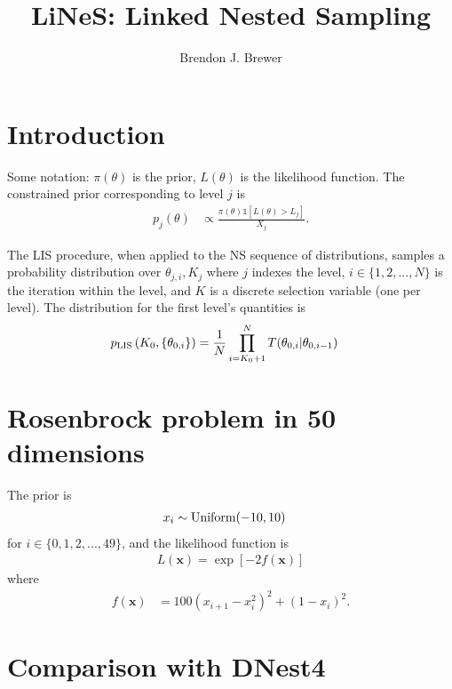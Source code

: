 \documentclass[a4paper, 12pt]{article}
\title{LiNeS: Linked Nested Sampling}
\author{Brendon J. Brewer}
\date{}
\begin{document}
\maketitle


\setlength{\parindent}{0pt}
\setlength{\parskip}{8pt}

\section{Introduction}
Some notation: $\pi(\theta)$ is the prior, $L(\theta)$ is the
likelihood function. The constrained prior corresponding
to level $j$ is
\begin{align}
p_j(\theta) &\propto
\frac{\pi(\theta)\mathds{1}\left[L(\theta) > L_j\right]}
{X_j}.
\end{align}

The LIS procedure, when applied to the NS sequence of
distributions, samples a probability distribution over
$\theta_{j,i}, K_j$ where $j$ indexes the level,
$i \in \{1, 2, ..., N\}$ is the
iteration within the level, and $K$ is a discrete
selection variable (one per level). The distribution for the
first level's quantities is
\begin{align}
p_{\rm LIS}\left(K_0, \left\{\theta_{0,i}\right\}\right)
&= \frac{1}{N} \prod_{i=K_0+1}^N T(\theta_{0,i} | \theta_{0,i-1})
\end{align}


\section{Rosenbrock problem in 50 dimensions}

The prior is
\begin{align}
x_i &\sim \textnormal{Uniform}(-10, 10)
\end{align}
for $i \in \{0, 1, 2, ..., 49\}$,
and the likelihood function is
\begin{align}
L(\boldsymbol{x}) = \exp\left[-2f(\boldsymbol{x})\right]
\end{align}
where
\begin{align}
f(\boldsymbol{x}) &= 100(x_{i+1} - x_{i}^2)^2 + (1-x_i)^2.
\end{align}




\section{Comparison with DNest4}
\end{document}

